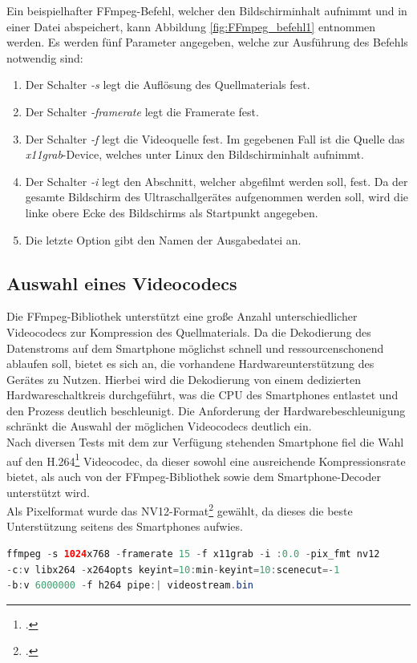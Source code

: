 Ein beispielhafter FFmpeg-Befehl, welcher den Bildschirminhalt aufnimmt und in einer Datei abspeichert, kann Abbildung \ref{fig:FFmpeg_befehl1} entnommen werden. Es werden fünf Parameter angegeben, welche zur Ausführung des Befehls notwendig sind:
\begin{enumerate} 
	\item Der Schalter \textit{-s} legt die Auflösung des Quellmaterials fest. 
	\item Der Schalter \textit{-framerate} legt die Framerate fest.
	\item Der Schalter \textit{-f} legt die Videoquelle fest. Im gegebenen Fall ist die Quelle  das \textit{x11grab}-Device, welches unter Linux den Bildschirminhalt aufnimmt.
	\item Der Schalter \textit{-i} legt den Abschnitt, welcher abgefilmt werden soll, fest. Da der gesamte Bildschirm des Ultraschallgerätes aufgenommen werden soll, wird die linke obere Ecke des Bildschirms als Startpunkt angegeben.
	\item Die letzte Option gibt den Namen der Ausgabedatei an. 
\end{enumerate}

\subsection{Auswahl eines Videocodecs}
Die FFmpeg-Bibliothek unterstützt eine große Anzahl unterschiedlicher Videocodecs zur Kompression des Quellmaterials. Da die Dekodierung des Datenstroms auf dem Smartphone möglichst schnell und ressourcenschonend ablaufen soll, bietet es sich an, die vorhandene Hardwareunterstützung des Gerätes zu Nutzen. Hierbei wird die Dekodierung von einem dedizierten Hardwareschaltkreis durchgeführt, was die CPU des Smartphones entlastet und den Prozess deutlich beschleunigt. Die Anforderung der Hardwarebeschleunigung schränkt die Auswahl der möglichen Videocodecs deutlich ein.\\
Nach diversen Tests mit dem zur Verfügung stehenden Smartphone fiel die Wahl auf den H.264\footcite{H264} Videocodec, da dieser sowohl eine ausreichende Kompressionsrate bietet, als auch von der FFmpeg-Bibliothek sowie dem Smartphone-Decoder unterstützt wird.\\
Als Pixelformat wurde das NV12-Format\footcite{NV12} gewählt, da dieses die beste Unterstützung seitens des Smartphones aufwies.\\

\begin{lstlisting}[caption=Endgültiger FFmpeg-Konsolenbefehl zur Videoaufnahme, label=lst:ffmpeg_befehl, language=Java]
ffmpeg -s 1024x768 -framerate 15 -f x11grab -i :0.0 -pix_fmt nv12 
-c:v libx264 -x264opts keyint=10:min-keyint=10:scenecut=-1 
-b:v 6000000 -f h264 pipe:| videostream.bin
\end{lstlisting}

